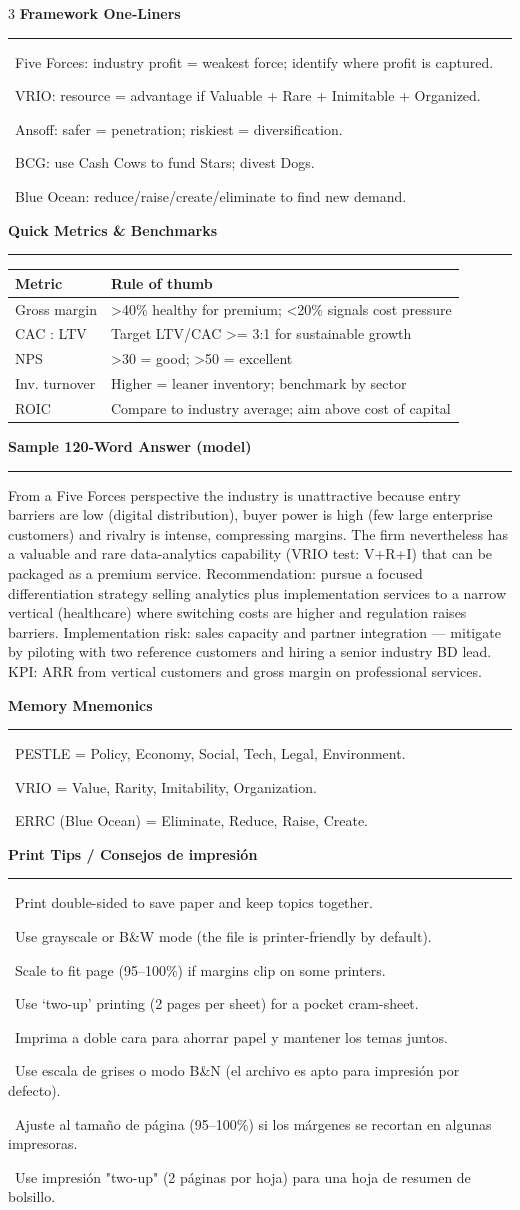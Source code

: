 \documentclass[7.6pt,letterpaper]{article}
\newcommand{\secbar}[1]{%
    \vspace{2pt}\noindent\textbf{#1}\par\vspace{1pt}\hrule\vspace{2pt}%
  }
\newcommand{\secbar}[1]{%
    \vspace{3pt}%
    \noindent\colorbox{navy}{\parbox{\dimexpr\linewidth-2\fboxsep}{%
      \fontsize{6.8pt}{8pt}\sffamily\bfseries\color{white}\strut\ #1\strut}}%
    \vspace{1pt}\par%
  }
\newcommand{\T}[1]{\textbf{\color{navy}#1}}
\newcommand{\bul}[1]{\noindent{\color{mid}$\triangleright$}\ #1\par}
\newcommand{\sh}{\rowcolor{strip}}
\newcommand{\ctab}[1]{{\fontsize{6.2pt}{7pt}\selectfont\setlength{\tabcolsep}{2.5pt}#1}}
\begin{document}
\begin{multicols}{3}
\secbar{Framework One‑Liners}
\bul{Five Forces: industry profit = weakest force; identify where profit is captured.}
\bul{VRIO: resource = advantage if Valuable + Rare + Inimitable + Organized.}
\bul{Ansoff: safer = penetration; riskiest = diversification.}
\bul{BCG: use Cash Cows to fund Stars; divest Dogs.}
\bul{Blue Ocean: reduce/raise/create/eliminate to find new demand.}

\secbar{Quick Metrics & Benchmarks}
\ctab{\begin{tabular}{@{}p{2.0cm}p{4.4cm}@{}}\toprule
\sh \T{Metric} & \T{Rule of thumb} \\\midrule
Gross margin & >40\% healthy for premium; <20\% signals cost pressure \\
CAC : LTV & Target LTV/CAC \textgreater{}= 3:1 for sustainable growth \\
NPS & >30 = good; >50 = excellent \\
Inv. turnover & Higher = leaner inventory; benchmark by sector \\
ROIC & Compare to industry average; aim above cost of capital \\
\bottomrule
\end{tabular}}

\secbar{Sample 120‑Word Answer (model)}
From a Five Forces perspective the industry is unattractive because entry barriers are low (digital distribution), buyer power is high (few large enterprise customers) and rivalry is intense, compressing margins. The firm nevertheless has a valuable and rare data-analytics capability (VRIO test: V+R+I) that can be packaged as a premium service. Recommendation: pursue a focused differentiation strategy selling analytics plus implementation services to a narrow vertical (healthcare) where switching costs are higher and regulation raises barriers. Implementation risk: sales capacity and partner integration — mitigate by piloting with two reference customers and hiring a senior industry BD lead. KPI: ARR from vertical customers and gross margin on professional services.

\secbar{Memory Mnemonics}
\bul{PESTLE = Policy, Economy, Social, Tech, Legal, Environment.}
\bul{VRIO = Value, Rarity, Imitability, Organization.}
\bul{ERRC (Blue Ocean) = Eliminate, Reduce, Raise, Create.}

\secbar{Print Tips / Consejos de impresión}
\bul{Print double-sided to save paper and keep topics together.}
\bul{Use grayscale or B\&W mode (the file is printer-friendly by default).}
\bul{Scale to fit page (95--100\%) if margins clip on some printers.}
\bul{Use `two-up' printing (2 pages per sheet) for a pocket cram-sheet.}
\bul{Imprima a doble cara para ahorrar papel y mantener los temas juntos.}
\bul{Use escala de grises o modo B\&N (el archivo es apto para impresión por defecto).}
\bul{Ajuste al tamaño de página (95--100\%) si los márgenes se recortan en algunas impresoras.}
\bul{Use impresión "two-up" (2 páginas por hoja) para una hoja de resumen de bolsillo.}

\end{multicols}
\end{document}
